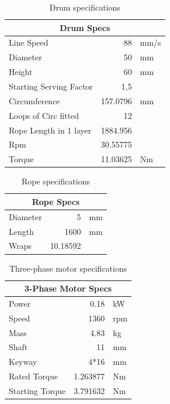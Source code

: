 \begin{table}[H]
  \centering
  \caption{Drum specifications}
  \begin{tabular}{|l|r|l|}
    \hline
    \multicolumn{3}{|c|}{\textbf{Drum Specs}} \\
    \hline
    Line Speed & 88 & mm/s \\
    Diameter & 50 & mm \\
    Height & 60 & mm \\
    Starting Serving Factor & 1,5 & \\
    Circumference & 157.0796 & mm \\
    Loops of Circ fitted & 12 & \\
    Rope Length in 1 layer & 1884.956 & \\
    Rpm & 30.55775 & \\
    Torque & 11.03625 & Nm \\
    \hline
  \end{tabular}
  \label{tab:drum_specs}
\end{table}

\begin{table}[H]
  \centering
  \caption{Rope specifications}
  \begin{tabular}{|l|r|l|}
    \hline
    \multicolumn{3}{|c|}{\textbf{Rope Specs}} \\
    \hline
    Diameter & 5 & mm \\
    Length & 1600 & mm \\
    Wraps & 10.18592 & \\
    \hline
  \end{tabular}
  \label{tab:rope_specs}
\end{table}

\begin{table}[H]
  \centering
  \caption{Three-phase motor specifications}
  \begin{tabular}{|l|r|l|}
    \hline
    \multicolumn{3}{|c|}{\textbf{3-Phase Motor Specs}} \\
    \hline
    Power & 0.18 & kW \\
    Speed & 1360 & rpm \\
    Mass & 4.83 & kg \\
    Shaft & 11 & mm \\
    Keyway & 4*16 & mm \\
    Rated Torque & 1.263877 & Nm \\
    Starting Torque & 3.791632 & Nm \\
    \hline
  \end{tabular}
  \label{tab:motor_specs}
\end{table}


